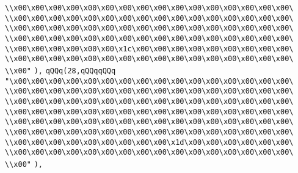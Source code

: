 \verb|\\x00\x00\x00\x00\x00\x00\x00\x00\x00\x00\x00\x00\x00\x00\x00\x00\|\newline
\verb|\\x00\x00\x00\x00\x00\x00\x00\x00\x00\x00\x00\x00\x00\x00\x00\x00\|\newline
\verb|\\x00\x00\x00\x00\x00\x00\x00\x00\x00\x00\x00\x00\x00\x00\x00\x00\|\newline
\verb|\\x00\x00\x00\x00\x00\x00\x00\x00\x00\x00\x00\x00\x00\x00\x00\x00\|\newline
\verb|\\x00\x00\x00\x00\x00\x00\x1c\x00\x00\x00\x00\x00\x00\x00\x00\x00\|\newline
\verb|\\x00\x00\x00\x00\x00\x00\x00\x00\x00\x00\x00\x00\x00\x00\x00\x00\|\newline
\verb|\\x00"|\newline
\verb|),|\newline
\verb|qQQq(28,qQQqqQQq|\newline
\verb|"\x00\x00\x00\x00\x00\x00\x00\x00\x00\x00\x00\x00\x00\x00\x00\x00\|\newline
\verb|\\x00\x00\x00\x00\x00\x00\x00\x00\x00\x00\x00\x00\x00\x00\x00\x00\|\newline
\verb|\\x00\x00\x00\x00\x00\x00\x00\x00\x00\x00\x00\x00\x00\x00\x00\x00\|\newline
\verb|\\x00\x00\x00\x00\x00\x00\x00\x00\x00\x00\x00\x00\x00\x00\x00\x00\|\newline
\verb|\\x00\x00\x00\x00\x00\x00\x00\x00\x00\x00\x00\x00\x00\x00\x00\x00\|\newline
\verb|\\x00\x00\x00\x00\x00\x00\x00\x00\x00\x00\x00\x00\x00\x00\x00\x00\|\newline
\verb|\\x00\x00\x00\x00\x00\x00\x00\x00\x00\x1d\x00\x00\x00\x00\x00\x00\|\newline
\verb|\\x00\x00\x00\x00\x00\x00\x00\x00\x00\x00\x00\x00\x00\x00\x00\x00\|\newline
\verb|\\x00"|\newline
\verb|),|\newline
